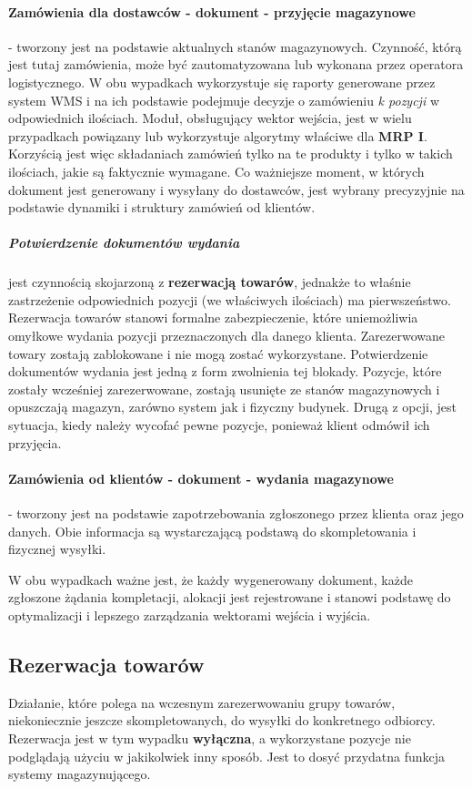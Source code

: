 		\paragraph{Zamówienia dla dostawców - dokument  - przyjęcie magazynowe} - tworzony jest na podstawie
		aktualnych stanów magazynowych. Czynność, którą jest tutaj zamówienia, może być zautomatyzowana lub wykonana
		przez operatora logistycznego. W obu wypadkach wykorzystuje się raporty generowane przez system WMS i 
		na ich podstawie podejmuje decyzje o zamówieniu \textit{k pozycji} w odpowiednich ilościach. Moduł, obsługujący
		wektor wejścia, jest w wielu przypadkach powiązany lub wykorzystuje algorytmy właściwe dla \textbf{MRP I}. 
		Korzyścią jest więc składaniach zamówień tylko na te produkty i tylko w takich ilościach, jakie są faktycznie wymagane.
		Co ważniejsze moment, w których dokument jest generowany i wysyłany do dostawców, jest wybrany precyzyjnie na
		podstawie dynamiki i struktury zamówień od klientów.
			\subparagraph{Potwierdzenie dokumentów wydania} jest czynnością skojarzoną z \textbf{rezerwacją towarów},
			jednakże to właśnie zastrzeżenie odpowiednich pozycji (we właściwych ilościach) ma pierwszeństwo. 
			Rezerwacja towarów stanowi formalne zabezpieczenie, które uniemożliwia omyłkowe wydania 
			pozycji przeznaczonych dla danego klienta. Zarezerwowane towary zostają zablokowane i nie mogą 
			zostać wykorzystane.
			Potwierdzenie dokumentów wydania jest jedną z form zwolnienia tej blokady. Pozycje, które zostały
			wcześniej zarezerwowane, zostają usunięte ze stanów magazynowych i opuszczają magazyn, zarówno
			system jak i fizyczny budynek. Drugą z opcji, jest sytuacja, kiedy należy wycofać pewne 
			pozycje, ponieważ klient odmówił ich przyjęcia.  
		\paragraph{Zamówienia od klientów -  dokument  - wydania magazynowe} - tworzony jest na podstawie zapotrzebowania
		zgłoszonego przez klienta oraz jego danych. Obie informacja są wystarczającą podstawą do skompletowania
		i fizycznej wysyłki. 
		
		W obu wypadkach ważne jest, że każdy wygenerowany dokument, każde zgłoszone żądania kompletacji, alokacji
		jest rejestrowane i stanowi podstawę do optymalizacji i lepszego zarządzania wektorami wejścia i wyjścia. 
	\subsection{Rezerwacja towarów}
		Działanie, które polega na wczesnym zarezerwowaniu grupy towarów, niekoniecznie jeszcze skompletowanych,
		do wysyłki do konkretnego odbiorcy. Rezerwacja jest w tym wypadku \textbf{wyłączna}, a wykorzystane
		pozycje nie podglądają użyciu w jakikolwiek inny sposób. Jest to dosyć przydatna funkcja systemy magazynującego.\\
		

